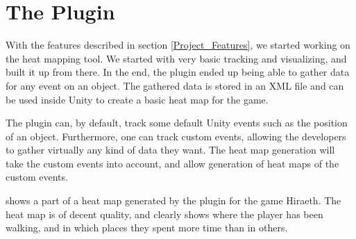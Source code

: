 \section{The Plugin}
\label{Plugin}

With the features described in section \ref{Project_Features}, we started working on the heat mapping tool. We started with very basic tracking and visualizing, and built it up from there. In the end, the plugin ended up being able to gather data for any event on an object. The gathered data is stored in an XML file and can be used inside Unity to create a basic heat map for the game.

The plugin can, by default, track some default Unity events such as the position of an object. Furthermore, one can track custom events, allowing the developers to gather virtually any kind of data they want. The heat map generation will take the custom events into account, and allow generation of heat maps of the custom events.

 shows a part of a heat map generated by the plugin for the game Hiraeth. The heat map is of decent quality, and clearly shows where the player has been walking, and in which places they spent more time than in others.

